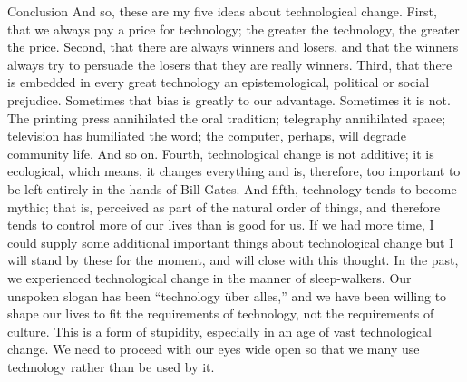 Conclusion
And so, these are my five ideas about technological change. First, that we always pay a price for
technology; the greater the technology, the greater the price. Second, that there are always winners and
losers, and that the winners always try to persuade the losers that they are really winners. Third, that there
is embedded in every great technology an epistemological, political or social prejudice. Sometimes that
bias is greatly to our advantage. Sometimes it is not. The printing press annihilated the oral tradition;
telegraphy annihilated space; television has humiliated the word; the computer, perhaps, will degrade
community life. And so on. Fourth, technological change is not additive; it is ecological, which means, it
changes everything and is, therefore, too important to be left entirely in the hands of Bill Gates. And fifth,
technology tends to become mythic; that is, perceived as part of the natural order of things, and therefore
tends to control more of our lives than is good for us.
If we had more time, I could supply some additional important things about technological change but I will
stand by these for the moment, and will close with this thought. In the past, we experienced technological
change in the manner of sleep-walkers. Our unspoken slogan has been “technology über alles,” and we
have been willing to shape our lives to fit the requirements of technology, not the requirements of culture.
This is a form of stupidity, especially in an age of vast technological change. We need to proceed with our
eyes wide open so that we many use technology rather than be used by it. 